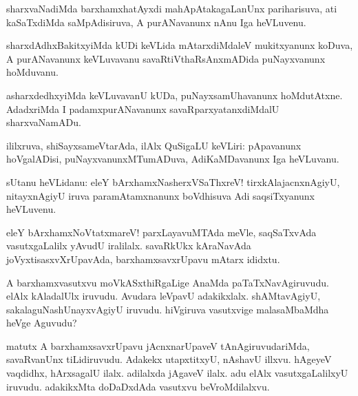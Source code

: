\documentclass{article}
\begin{document}
\begin{mn}
sharxvaNadiMda barxhamxhatAyxdi mahApAtakagaLanUnx pariharisuva, 
ati kaSaTxdiMda saMpAdisiruva, A purANavanunx nAnu Iga heVLuvenu.
\end{mn}

\begin{mn}
sharxdAdhxBakitxyiMda kUDi keVLida mAtarxdiMdaleV mukitxyanunx koDuva, 
A purANavanunx keVLuvavanu savaRtiVthaRsAnxmADida puNayxvanunx hoMduvanu.
\end{mn}

\begin{mn}
asharxdedhxyiMda keVLuvavanU kUDa, puNayxsamUhavanunx hoMdutAtxne. 
AdadxriMda I padamxpurANavanunx savaRparxyatanxdiMdalU sharxvaNamADu. 
\end{mn}

\begin{mn}
ililxruva, shiSayxsameVtarAda, ilAlx QuSigaLU keVLiri: pApavanunx hoVgalADisi,
puNayxvanunxMTumADuva, AdiKaMDavanunx Iga heVLuvanu.
\end{mn}


\begin{mn}
sUtanu heVLidanu: eleY bArxhamxNasherxVSaThxreV! tirxkAlajacnxnAgiyU, 
nitayxnAgiyU iruva paramAtamxnanunx boVdhisuva Adi saqsiTxyanunx heVLuvenu.
\end{mn}

\begin{mn}
eleY bArxhamxNoVtatxmareV! parxLayavuMTAda meVle, saqSaTxvAda vasutxgaLalilx 
yAvudU iralilalx. savaRkUkx kAraNavAda joVyxtisasxvXrUpavAda, 
barxhamxsavxrUpavu mAtarx ididxtu.
\end{mn}

\begin{mn}
A barxhamxvasutxvu moVkASxthiRgaLige AnaMda paTaTxNavAgiruvudu. 
elAlx kAladalUlx iruvudu. Avudara leVpavU adakikxlalx. shAMtavAgiyU, 
sakalaguNashUnayxvAgiyU iruvudu. hiVgiruva vasutxvige malasaMbaMdha heVge Aguvudu? 
\end{mn}

\begin{mn}
matutx A barxhamxsavxrUpavu jAcnxnarUpaveV tAnAgiruvudariMda, 
savaRvanUnx tiLidiruvudu. Adakekx utapxtitxyU,  nAshavU illxvu. hAgeyeV
vaqdidhx, hArxsagalU ilalx. adilalxda jAgaveV ilalx. 
adu elAlx vasutxgaLalilxyU iruvudu. adakikxMta doDaDxdAda vasutxvu beVroMdilalxvu.
\end{mn}
\end{document}
